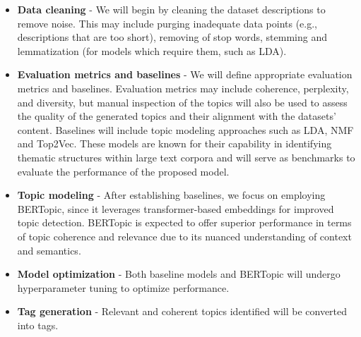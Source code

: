 \documentclass{article}
\begin{document}
\begin{itemize}
    \item \textbf{Data cleaning} - We will begin by cleaning the dataset descriptions to remove noise. This may include purging inadequate data points (e.g., descriptions that are too short), removing of stop words, stemming and lemmatization (for models which require them, such as LDA).

    \item \textbf{Evaluation metrics and baselines} - We will define appropriate evaluation metrics and baselines. Evaluation metrics may include coherence, perplexity, and diversity, but manual inspection of the topics will also be used to assess the quality of the generated topics and their alignment with the datasets' content. Baselines will include topic modeling approaches such as LDA, NMF and Top2Vec. These models are known for their capability in identifying thematic structures within large text corpora and will serve as benchmarks to evaluate the performance of the proposed model.

    \item \textbf{Topic modeling} - After establishing baselines, we focus on employing BERTopic, since it leverages transformer-based embeddings for improved topic detection. BERTopic is expected to offer superior performance in terms of topic coherence and relevance due to its nuanced understanding of context and semantics.

    \item \textbf{Model optimization} - Both baseline models and BERTopic will undergo hyperparameter tuning to optimize performance.

    \item \textbf{Tag generation} - Relevant and coherent topics identified will be converted into tags.
\end{itemize}
\end{document}
